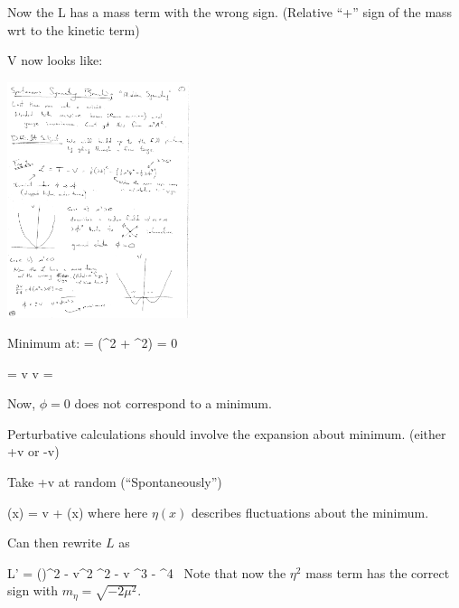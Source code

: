 {Now the L has a mass term with the wrong sign.  
(Relative ``+'' sign of the mass wrt to the kinetic term)

V now looks like:

\bc
\includegraphics[width=0.4\textwidth]{./V_mu2negative.pdf}
\ec

Minimum at:
\be
{} = \phi (\mu^2 + \lambda \phi^2) = 0 
\ee

\be
\phi = \pm v  \hspace*{1in} v = \sqrt{-\mu^2\lambda}
\ee

Now, $\phi=0$ does not correspond to a minimum.

Perturbative calculations should involve the expansion about minimum.  (either +v or -v) 

Take +v at random (``Spontaneously'') 

\be
\phi(x) = v + \eta(x)
\ee
where here $\eta(x)$ describes fluctuations about the minimum. 

Can then rewrite $L$ as 

\be
L' =  (\partial \eta)^2 - \lambda v^2 \eta^2 - \lambda v \eta^3 - \lambda \eta^4\ 
\ee
Note that now the $\eta^2$ mass term has the correct sign with $m_\eta = \sqrt{-2\mu^2}$.

}
